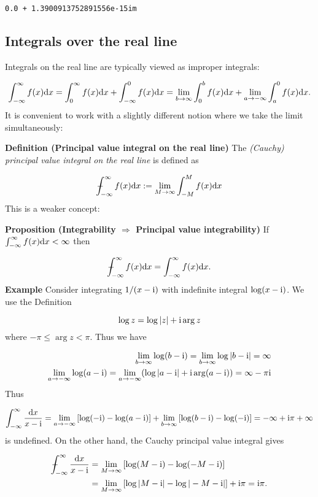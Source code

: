 \documentclass[12pt,a4paper]{article}
\def\D{ {\rm d} }
\def\I{ {\rm i} }
\def\Xint#1{ \mathchoice
   {\XXint\displaystyle\textstyle{#1} }%
   {\XXint\textstyle\scriptstyle{#1} }%
   {\XXint\scriptstyle\scriptscriptstyle{#1} }%
   {\XXint\scriptscriptstyle\scriptscriptstyle{#1} }%
   \!\int}
\def\XXint#1#2#3{ {\setbox0=\hbox{$#1{#2#3}{\int}$}
     \vcenter{\hbox{$#2#3$}}\kern-.5\wd0} }
\def\dashint{\Xint-}
\def\infdashint{\dashint_{-\infty}^\infty}
\def\dx{\D x}
\def\br[#1]{\left[{#1}\right]}
\begin{document}
\begin{lstlisting}
0.0 + 1.3900913752891556e-15im
\end{lstlisting}


\subsection{Integrals over the real line}
Integrals on the real line are typically viewed as improper integrals:

\[
\int_{-\infty}^\infty f(x) \dx = \int_0^\infty f(x) \dx +\int_{-\infty}^0 f(x)\dx =
\lim_{b \rightarrow \infty} \int_0^b f(x) \dx + \lim_{a \rightarrow -\infty} \int_a^0 f(x) \dx.
\]
It is convenient to work with a slightly different notion where we take the limit simultaneously:

\textbf{Definition (Principal value integral on the real line)} The \emph{(Cauchy) principal value integral on the real line} is defined as

\[
\infdashint f(x) \dx := \lim_{M\rightarrow \infty} \int_{-M}^M f(x) \dx
\]
This is a weaker concept:

\textbf{Proposition (Integrability $\Rightarrow$ Principal value integrability)} If $\int_{-\infty}^\infty f(x) \dx < \infty$ then

\[
\infdashint f(x) \dx = \int_{-\infty}^\infty f(x) \dx.
\]
\textbf{Example} Consider integrating $1/(x-\I)$ with indefinite integral $\log(x-\I)$. We use the Definition

\[
\log z = \log |z| + \I \arg z
\]
where $- \pi \leq \arg z < \pi$. Thus we have


\begin{align*}
\lim_{b \rightarrow \infty} \log(b - \I) = \lim_{b \rightarrow \infty} \log|b - \I| = \infty \\
\lim_{a \rightarrow -\infty} \log(a - \I) = \lim_{a \rightarrow -\infty} (\log|a - \I| + \I \arg(a-\I)) = \infty - \pi \I
\end{align*}
Thus

\[
\int_{-\infty}^\infty {\dx \over x - \I} = \lim_{a \rightarrow -\infty} \br[\log(-\I) - \log(a-\I)] +
\lim_{b \rightarrow \infty} \br[\log(b-\I) - \log(-\I)] =  -\infty + \I \pi + \infty
\]
is undefined. On the other hand, the Cauchy principal value integral gives


\begin{align*}
\infdashint {\dx \over x - \I}&  = \lim_{M \rightarrow \infty} \br[\log(M-\I) - \log(-M - \I)] \\
                              & = \lim_{M \rightarrow \infty} \br[\log|M-\I| - \log|-M - \I|]  + \I \pi = \I \pi.
\end{align*}
\end{document}
